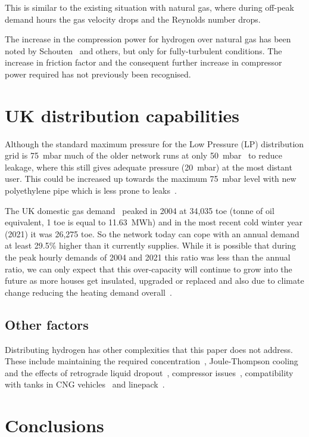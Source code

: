 \documentclass[5p]{elsarticle} %
\begin{document}
This is similar to the existing situation with natural gas, where during off-peak demand hours the gas velocity drops and the Reynolds number drops. 

The increase in the compression power for hydrogen over natural gas  has been noted by Schouten~\citep{Schouten2004} and others, but only for fully-turbulent conditions. 
The increase in friction factor and the consequent further increase in compressor power required has not previously been recognised.

\section{UK distribution capabilities}
\label{sec:distcapable}

Although the standard maximum pressure for the Low Pressure (LP) distribution grid is 75~mbar much of the older network runs at only 50~mbar~\cite{ARUP2023} to reduce leakage, where this still gives adequate pressure (20~mbar) at the most distant user. 
This could be increased up towards the maximum 75~mbar level with new polyethylene pipe which is less prone to leaks~\citep{ARUP2023}. 

The UK domestic gas demand~\citep{DESNZ2023a} peaked in 2004 at 34,035 toe (tonne of oil equivalent, 1 toe is equal to 11.63~MWh) and in the most recent cold winter year (2021) it was 26,275 toe. 
So the network today can cope with an annual demand at least 29.5\% higher than it currently supplies.
While it is possible that during the peak hourly demands of 2004 and 2021 this ratio was less than the annual ratio, we can only expect that this over-capacity will continue to grow into the future as more houses get insulated, upgraded or replaced and also due to climate change reducing the heating demand overall~\citep{Christidis2021}. 

\subsection{Other factors}

Distributing hydrogen has other complexities that this paper does not address. 
These include maintaining the required concentration~\citep{H2Blends21}, Joule-Thompson cooling and the effects of retrograde liquid dropout~\citep{Schouten2004}, compressor issues~\citep{Wit2018}, compatibility with tanks in CNG vehicles~\citep{Altfeld2013} and linepack~\citep{Witek2022}.

\section{Conclusions}
\label{sec:conc}
\end{document}
